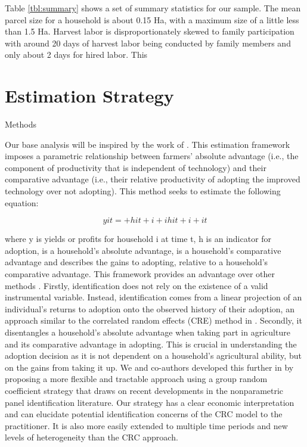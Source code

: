 \documentclass{article}
\begin{document}
Table \ref{tbl:summary} shows a set of summary statistics for our sample. The mean parcel size for a household is about 0.15 Ha, with a maximum size of a little less than 1.5 Ha. Harvest labor is disproportionately skewed to family participation with around 20 days of harvest labor being conducted by family members and only about 2 days for hired labor. This 




\section{Estimation Strategy}

Methods 

Our base analysis will be inspired by the work of \citep{Suri2011-oi}. This estimation framework imposes a parametric relationship between farmers' absolute advantage (i.e., the component of productivity that is independent of technology) and their comparative advantage (i.e., their relative productivity of adopting the improved technology over not adopting). This method seeks to estimate the following equation:

$$
yit=+ hit + i+ihit + i+it
$$

where y is yields or profits for household i at time t, h is an indicator for adoption,  is a household’s absolute advantage,  is a household’s comparative advantage and  describes the gains to adopting, relative to a household’s comparative advantage. This framework provides an advantage over other methods \citep{Wooldridge1997-xj,Heckman1998-pt}. Firstly, identification does not rely on the existence of a valid instrumental variable. Instead, identification comes from a linear projection of an individual's returns to adoption onto the observed history of their adoption, an approach similar to the correlated random effects (CRE) method in \citep{Chamberlain1984-uk}. Secondly, it disentangles a household’s absolute advantage when taking part in agriculture and its comparative advantage in adopting. This is crucial in understanding the adoption decision as it is not dependent on a household’s agricultural ability, but on the gains from taking it up. We and co-authors developed this further in \citep{Tjernstrom_Emilia_Dalia_Ghanem_Oscar_Barriga_Cabanillas_Travis_J_Lybbert_Jeffrey_D_Michler_and_Aleksandr_Michuda2020-bc} by proposing a more flexible and tractable approach using a group random coefficient strategy that draws on recent developments in the nonparametric panel identification literature. Our strategy has a clear economic interpretation and can elucidate potential identification concerns of the CRC model to the practitioner. It is also more easily extended to multiple time periods and new levels of heterogeneity than the CRC approach.
\end{document}
